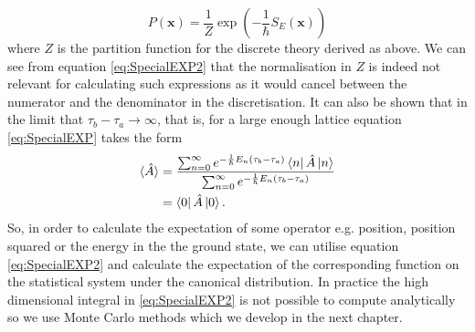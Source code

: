 \documentclass[12pt]{article}
\begin{document}
        \begin{equation}
            P\left(\bm{x}\right) = \frac{1}{Z}\exp{\left(-\frac{1}{\hbar}S_{E}\left(\bm{x}\right)\right)}
        \end{equation}
        where $Z$ is the partition function for the discrete theory derived as above. We can see from equation \ref{eq:SpecialEXP2} that the normalisation in $Z$ is indeed not relevant for calculating such expressions as it would cancel between the numerator and the denominator in the discretisation. It can also be shown that in the limit that $\tau_b - \tau_a \rightarrow \infty$, that is, for a large enough lattice equation \ref{eq:SpecialEXP} takes the form \cite{creutz_freedman_1981}
        \begin{align}
            \braket{\hat{A}} & = \frac{\sum_{n=0}^{\infty}e^{-\frac{1}{\hbar}E_n\left(\tau_b-\tau_a\right)}\bra{n}\hat{A}\ket{n}}{\sum_{n=0}^{\infty}e^{-\frac{1}{\hbar}E_n\left(\tau_b-\tau_a\right)}} \\
            & = \bra{0}\hat{A}\ket{0}.
        \end{align}
        So, in order to calculate the expectation of some operator e.g. position, position squared or the energy in the the ground state, we can utilise equation \ref{eq:SpecialEXP2} and calculate the expectation of the corresponding function on the statistical system under the canonical distribution.  In practice the high dimensional integral in \ref{eq:SpecialEXP2} is not possible to compute analytically so we use Monte Carlo methods which we develop in the next chapter.
\end{document}
